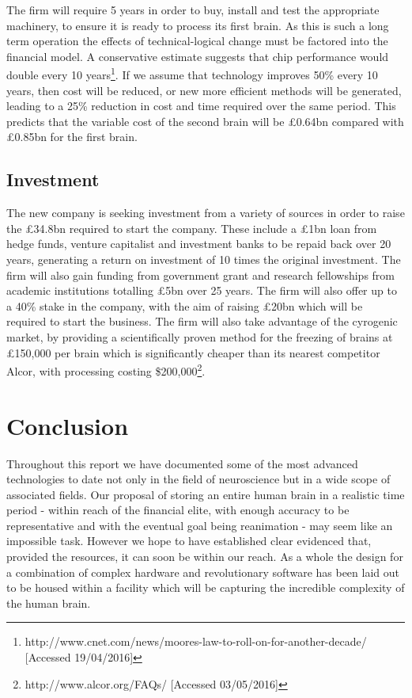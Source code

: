 \documentclass[a4paper, 11pt]{article}
\numberwithin{equation}{section}
\begin{document}
The firm will require 5 years in order to buy, install and test the appropriate machinery, to ensure it is ready to process its first brain. As this is such a long term operation the effects of technical-logical change must be factored into the financial model. A conservative estimate suggests that chip performance would double every 10 years\footnote{http://www.cnet.com/news/moores-law-to-roll-on-for-another-decade/ [Accessed 19/04/2016]}. If we assume that technology improves 50\% every 10 years, then cost will be reduced, or new more efficient methods will be generated, leading to a 25\% reduction in cost and time required over the same period. This predicts that the variable cost of the second brain will be \pounds 0.64bn compared with  \pounds 0.85bn for the first brain. 

\subsection{Investment}

The new company is seeking investment from a variety of sources in order to raise the \pounds 34.8bn required to start the company. These include a \pounds 1bn loan from hedge funds, venture capitalist and investment banks to be repaid back over 20 years, generating a return on investment of 10 times the original investment. The firm will also gain funding from government grant and research fellowships from academic institutions totalling \pounds 5bn over 25 years. The firm will also offer up to a 40\% stake in the company, with the aim of raising \pounds 20bn which will be required to start the business. The firm will also take advantage of the cyrogenic market, by providing a scientifically proven method for the freezing of brains at \pounds 150,000 per brain which is significantly cheaper than its nearest competitor Alcor, with processing costing \$200,000\footnote{http://www.alcor.org/FAQs/ [Accessed 03/05/2016]}. 



\newpage
	
\pagestyle{john}
\section{Conclusion}

Throughout this report we have documented some of the most advanced technologies to date not only in the field of neuroscience but in a wide scope of associated fields. Our proposal of storing an entire human brain in a realistic time period - within reach of the financial elite, with enough accuracy to be representative and with the eventual goal being reanimation - may seem like an impossible task. However we hope to have established clear evidenced that, provided the resources, it can soon be within our reach. As a whole the design for a combination of complex hardware and revolutionary software has been laid out to be housed within a facility which will be capturing the incredible complexity of the human brain.
\end{document}
